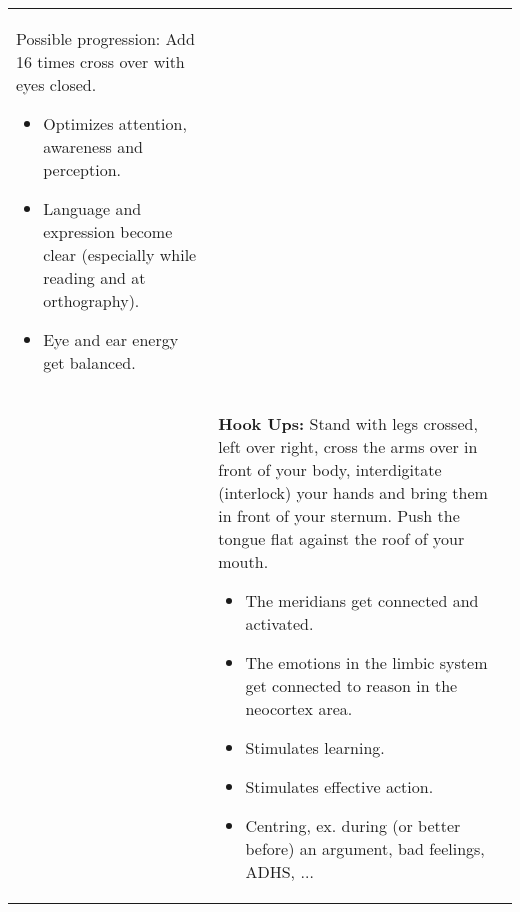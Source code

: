 \documentclass[../main.tex]{subfiles}
\begin{document}
{\begin{tabular}{p{2cm} p{10cm}}
{{Possible progression:}} Add 16 times cross over with eyes closed.
\begin{itemize}[noitemsep]
	\item Optimizes attention, awareness and perception.\index{effect!attention, improve}\index{effect!awareness, improve}\index{effect!perception, improve}
	\item Language and expression become clear (especially while reading and at orthography).\index{effect!expression, clear}\index{effect!language, clear}
	\item Eye and ear energy get balanced.\index{effect!Eye--ear, balance}
\end{itemize}
  \\
    \raisebox{-1.2\totalheight}{  \texttt{[image: Hookup]} }
  &
    \textbf{Hook Ups:} Stand with {legs crossed}, left over right, {cross the arms} over in front of your body, interdigitate (interlock) your hands and bring them {in front of your sternum}. Push the tongue flat against the roof of your mouth.

   
\begin{itemize}[noitemsep]
\item The meridians get connected and activated.
	\item The emotions in the limbic system get connected to reason in the neocortex area.\index{effect!emotion!connect to reason}\index{effect!reason!connect to emotion}
	\item Stimulates learning.\index{effect!learning!stimulate}
	\item Stimulates effective action.\index{effect!action!effective}
	\item Centring, ex. during (or better before) an argument, bad feelings, ADHS,\index{effect!center}\index{symptom!ADHS}\index{effect!feeling, bad one} $\ldots$
\end{itemize}

  \end{tabular}
}
\end{document}
